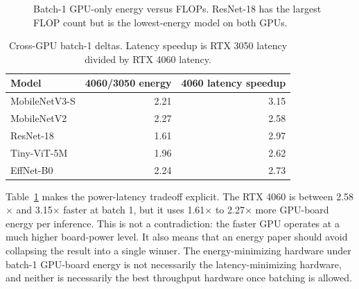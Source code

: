 \documentclass[conference]{IEEEtran}
\begin{document}
\begin{figure}[t]
\centering
{}
\caption{Batch-1 GPU-only energy versus FLOPs. ResNet-18 has the largest FLOP
count but is the lowest-energy model on both GPUs.}
\label{fig:energy-flops}
\end{figure}

\begin{table}[t]
\centering
\caption{Cross-GPU batch-1 deltas. Latency speedup is RTX 3050 latency divided
by RTX 4060 latency.}
\label{tab:deltas}
\scriptsize
\begin{tabular}{@{}lrr@{}}
\toprule
Model & 4060/3050 energy & 4060 latency speedup\\
\midrule
MobileNetV3-S & 2.21 & 3.15\\
MobileNetV2 & 2.27 & 2.58\\
ResNet-18 & 1.61 & 2.97\\
Tiny-ViT-5M & 1.96 & 2.62\\
EffNet-B0 & 2.24 & 2.73\\
\bottomrule
\end{tabular}
\end{table}

Table~\ref{tab:deltas} makes the power-latency tradeoff explicit. The RTX 4060
is between 2.58$\times$ and 3.15$\times$ faster at batch 1, but it uses
1.61$\times$ to 2.27$\times$ more GPU-board energy per inference. This is not
a contradiction: the faster GPU operates at a much higher board-power level.
It also means that an energy paper should avoid collapsing the result into a
single winner. The energy-minimizing hardware under batch-1 GPU-board energy is
not necessarily the latency-minimizing hardware, and neither is necessarily the
best throughput hardware once batching is allowed.
\end{document}
